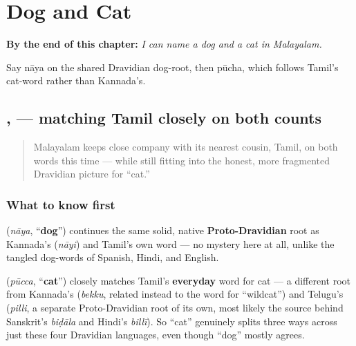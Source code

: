 
\chapter{Dog and Cat}
\label{ch:ml-dog-and-cat}

\begin{chapteropening}
\textbf{By the end of this chapter:} \emph{I can name a dog and a cat in Malayalam.}

Say nāya on the shared Dravidian dog-root, then pūcha, which follows Tamil's cat-word rather than Kannada's.
\end{chapteropening}

\section[\texorpdfstring{\ml{നായ}, \ml{പൂച്ച} (nāya, pūcca)}{നായ, പൂച്ച (nāya, pūcca)}]{,  — matching Tamil closely on both counts}

\label{lesson:ML-C21-naaya-poocha}



\begin{quote}
Malayalam keeps close company with its nearest cousin, Tamil, on both words this time — while still fitting into the honest, more fragmented Dravidian picture for \textquotedblleft{}cat.\textquotedblright{}
\end{quote}

\subsection*{What to know first}
\textbf{} (\emph{nāya}, \textquotedblleft{}\textbf{dog}\textquotedblright{}) continues the same solid, native \textbf{Proto-Dravidian} root as Kannada's \textbf{} (\emph{nāyi}) and Tamil's own word — no mystery here at all, unlike the tangled dog-words of Spanish, Hindi, and English.

\begin{cousinweb}
\textbf{} (\emph{pūcca}, \textquotedblleft{}\textbf{cat}\textquotedblright{}) closely matches Tamil's \textbf{everyday} word for cat — a different root from Kannada's \textbf{} (\emph{bekku}, related instead to the word for \textquotedblleft{}wildcat\textquotedblright{}) and Telugu's \textbf{} (\emph{pilli}, a separate Proto-Dravidian root of its own, most likely the source behind Sanskrit's \emph{biḍāla} and Hindi's \emph{billī}). So \textquotedblleft{}cat\textquotedblright{} genuinely splits three ways across just these four Dravidian languages, even though \textquotedblleft{}dog\textquotedblright{} mostly agrees.
\end{cousinweb}

